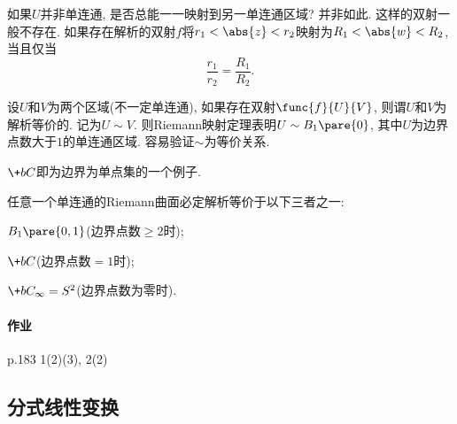 \documentclass[../ComplexVariable.tex]{subfiles}
\begin{document}
\begin{remark}
    如果$U$并非单连通, 是否总能一一映射到另一单连通区域? 并非如此. 这样的双射一般不存在. 如果存在解析的双射$f$将$r_1<\abs{z}<r_2$映射为$R_1<\abs{w}<R_2$, 当且仅当
    \[ \frac{r_1}{r_2} = \frac{R_1}{R_2}. \]
\end{remark}
设$U$和$V$为两个区域(不一定单连通), 如果存在双射$\func{f}{U}{V}$, 则谓$U$和$V$为解析等价的. 记为$U\sim V$. 则Riemann映射定理表明$U\sim B_1\pare{0}$, 其中$U$为边界点数大于$1$的单连通区域. 容易验证$\sim$为等价关系.
\begin{remark}
    $\+bC$即为边界为单点集的一个例子.
\end{remark}
\begin{theorem}
    任意一个单连通的Riemann曲面必定解析等价于以下三者之一:
    \begin{cenum}
        \item $B_1\pare{0,1}$(边界点数$\ge 2$时);
        \item $\+bC$(边界点数$=1$时);
        \item $\+bC_{\infty} = S^2$(边界点数为零时).
    \end{cenum}
\end{theorem}

\paragraph{作业} %
\label{par:作业}

p.183 1(2)(3), 2(2)


\subsection{分式线性变换} %
\label{sub:分式线性变换}
\end{document}
